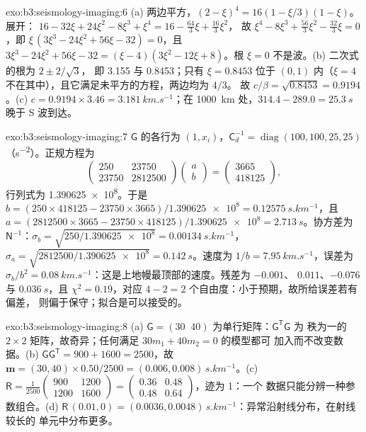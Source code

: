 \begin{solution}{exo:b3:seismology-imaging:6}
(a) 两边平方，$(2 - \xi)^4 = 16(1 - \xi/3)(1 - \xi)$。展开：
$16 - 32\xi + 24\xi^2 - 8\xi^3 + \xi^4 = 16 - \tfrac{64}{3}\xi + \tfrac{16}{3}\xi^2$，
故 $\xi^4 - 8\xi^3 + \tfrac{56}{3}\xi^2 - \tfrac{32}{3}\xi = 0$，即
$\xi\,(3\xi^3 - 24\xi^2 + 56\xi - 32) = 0$，且
$3\xi^3 - 24\xi^2 + 56\xi - 32 = (\xi - 4)(3\xi^2 - 12\xi + 8)$。根
$\xi = 0$ 不是波。(b) 二次式的根为 $2 \pm 2/\sqrt3$，
即 3.155 与 0.8453；只有 $\xi = 0.8453$ 位于 $(0, 1)$ 内（$\xi = 4$
不在其中），且它满足未平方的方程，两边均为 $4/3$。
故 $c/\beta = \sqrt{0.8453} = 0.9194$。(c) $c = 0.9194\times3.46 =
\qty{3.181}{km.s^{-1}}$；在 \qty{1000}{km} 处，$314.4 - 289.0 = \qty{25.3}{s}$
晚于 S 波到达。
\end{solution}

\begin{solution}{exo:b3:seismology-imaging:7}
$\mathsf G$ 的各行为 $(1, x_i)$，$\mathsf C_d^{-1} = \operatorname{diag}
(100, 100, 25, 25)$（\unit{s^{-2}}）。正规方程为
\[
  \begin{pmatrix} 250 & 23750 \\ 23750 & \num{2812500} \end{pmatrix}
  \begin{pmatrix} a \\ b \end{pmatrix}
  = \begin{pmatrix} 3665 \\ 418125 \end{pmatrix},
\]
行列式为 \num{1.390625e8}。于是 $b = (250\times418125 -
23750\times3665)/\num{1.390625e8} = \qty{0.12575}{s.km^{-1}}$，且
$a = (2812500\times3665 - 23750\times418125)/\num{1.390625e8} =
\qty{2.713}{s}$。协方差为 $\mathsf N^{-1}$：$\sigma_b =
\sqrt{250/\num{1.390625e8}} = \qty{0.00134}{s.km^{-1}}$，$\sigma_a =
\sqrt{2812500/\num{1.390625e8}} = \qty{0.142}{s}$。速度为
$1/b = \qty{7.95}{km.s^{-1}}$，误差为 $\sigma_b/b^2 =
\qty{0.08}{km.s^{-1}}$：这是上地幔最顶部的速度。残差为 $-0.001$、
$0.011$、$-0.076$ 与 $\qty{0.036}{s}$，且 $\chi^2 = 0.19$，对应 $4 - 2 = 2$
个自由度：小于预期，故所给误差若有偏差，
则偏于保守；拟合是可以接受的。
\end{solution}

\begin{solution}{exo:b3:seismology-imaging:8}
(a) $\mathsf G = (30\;\;40)$ 为单行矩阵：$\mathsf G^{\mathsf T}\mathsf G$ 为
秩为一的 $2\times2$ 矩阵，故奇异；任何满足 $30m_1 + 40m_2 = 0$ 的模型都可
加入而不改变数据。(b) $\mathsf G\mathsf G^{\mathsf T} =
900 + 1600 = 2500$，故 $\mathbf m = (30, 40)\times0.50/2500 =
(0.006, 0.008)\,\unit{s.km^{-1}}$。(c) $\mathsf R = \frac{1}{2500}
\begin{pmatrix} 900 & 1200 \\ 1200 & 1600 \end{pmatrix} =
\begin{pmatrix} 0.36 & 0.48 \\ 0.48 & 0.64 \end{pmatrix}$，迹为 1：一个
数据只能分辨一种参数组合。(d) $\mathsf R\,(0.01, 0) =
(0.0036, 0.0048)\,\unit{s.km^{-1}}$：异常沿射线分布，在射线较长的
单元中分布更多。
\end{solution}

